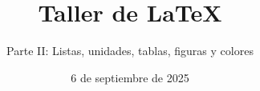 
\title{Taller de \LaTeX}
\subtitle{Parte II: Listas, unidades, tablas, figuras y colores}
\date{6 de septiembre de 2025}














